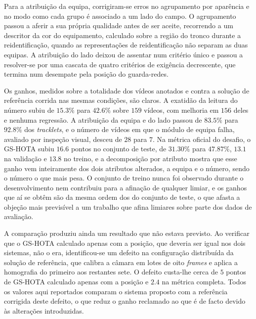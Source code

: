 Para a atribuição da equipa, corrigiram-se erros no agrupamento por aparência e no modo como cada
grupo é associado a um lado do campo. O agrupamento passou a aferir a sua própria qualidade antes de
ser aceite, recorrendo a um descritor da cor do equipamento, calculado sobre a região do tronco
durante a reidentificação, quando as representações de reidentificação não separam as duas equipas.
A atribuição do lado deixou de assentar num critério único e passou a resolver-se por uma cascata
de quatro critérios de exigência decrescente, que termina num desempate pela posição do
guarda-redes.

Os ganhos, medidos sobre a totalidade dos vídeos anotados e contra a solução de referência corrida
nas mesmas condições, são claros. A exatidão da leitura do número subiu de $15.3\%$ para
$42.6\%$ sobre $159$ vídeos, com melhoria em $156$ deles e nenhuma regressão. A atribuição da equipa e do lado passou de $83.5\%$ para $92.8\%$ dos
\emph{tracklets}, e o número de vídeos em que o módulo de equipa falha, avaliado por inspeção
visual, desceu de $28$ para $7$. Na métrica oficial do desafio, o
GS-HOTA subiu $16.6$ pontos no conjunto de teste, de $31.30\%$ para $47.87\%$,
$13.1$ na validação e $13.8$ no treino, e a decomposição por atributo mostra que
esse ganho vem inteiramente dos dois atributos alterados, a equipa e o número, sendo o número o que
mais pesa. O conjunto de treino nunca foi observado durante o desenvolvimento nem contribuiu para a
afinação de qualquer limiar, e os ganhos que aí se obtêm são da mesma ordem dos do conjunto de
teste, o que afasta a objeção mais previsível a um trabalho que afina limiares sobre parte dos dados
de avaliação.

A comparação produziu ainda um resultado que não estava previsto. Ao verificar que o GS-HOTA
calculado apenas com a posição, que deveria ser igual nos dois sistemas, não o era, identificou-se
um defeito na configuração distribuída da solução de referência, que calibra a câmara em lotes de
oito \emph{frames} e aplica a homografia do primeiro aos restantes sete. O defeito custa-lhe cerca
de $5$ pontos de GS-HOTA calculado apenas com a posição e $2.4$ na métrica
completa. Todos os valores aqui reportados comparam o sistema proposto
com a referência corrigida deste defeito, o que reduz o ganho reclamado ao que é de facto devido às
alterações introduzidas.

